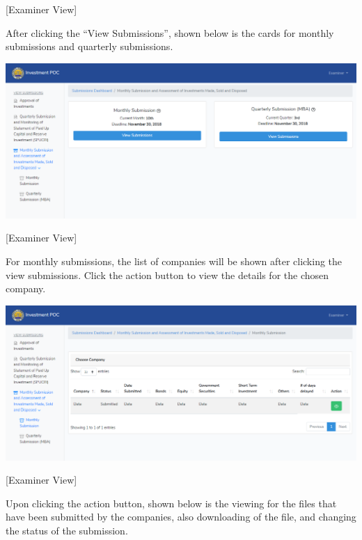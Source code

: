 \documentclass{article}
\begin{document}
[Examiner View]%

After clicking the “View Submissions”, shown below is
the cards for monthly submissions and quarterly submissions.%

\includegraphics[keepaspectratio=true]{up-ic-screens/image220}{}%

[Examiner View]%

For monthly submissions, the list of companies will be
shown after clicking the view submissions. Click the action button to
view the details for the chosen company.%

\includegraphics[keepaspectratio=true]{up-ic-screens/image139}{}%

[Examiner View]%

Upon clicking the action button, shown below is the
viewing for the files that have been submitted by the companies, also
downloading of the file, and changing the status of the
submission.%
\end{document}
